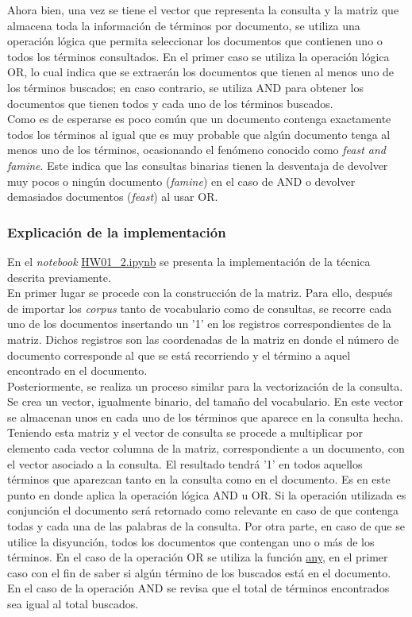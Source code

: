Ahora bien, una vez se tiene el vector que representa la consulta y la matriz que almacena toda la información de términos por documento, se utiliza una operación lógica que permita seleccionar los documentos que contienen uno o todos los términos consultados. En el primer caso se utiliza la operación lógica OR, lo cual indica que se extraerán los documentos que tienen al menos uno de los términos buscados; en caso contrario, se utiliza AND para obtener los documentos que tienen todos y cada uno de los términos buscados.\\

Como es de esperarse es poco común que un documento contenga exactamente todos los términos al igual que es muy probable que algún documento tenga al menos uno de los términos, ocasionando el fenómeno conocido como \textit{feast and famine}. Este indica que las consultas binarias tienen la desventaja de devolver muy pocos o ningún documento (\textit{famine}) en el caso de AND o devolver demasiados documentos (\textit{feast}) al usar OR.

\subsubsection{Explicación de la implementación}
En el \textit{notebook} \url{HW01_2.ipynb} se presenta la implementación de la técnica descrita previamente.\\

En primer lugar se procede con la construcción de la matriz. Para ello, después de importar los \textit{corpus} tanto de vocabulario como de consultas, se recorre cada uno de los documentos insertando un '1' en los registros correspondientes de la matriz. Dichos registros son las coordenadas de la matriz en donde el número de documento corresponde al que se está recorriendo y el término a aquel encontrado en el documento.\\

Posteriormente, se realiza un proceso similar para la vectorización de la consulta. Se crea un vector, igualmente binario, del tamaño del vocabulario. En este vector se almacenan unos en cada uno de los términos que aparece en la consulta hecha.\\

Teniendo esta matriz y el vector de consulta se procede a multiplicar por elemento cada vector columna de la matriz, correspondiente a un documento, con el vector asociado a la consulta. El resultado tendrá '1' en todos aquellos términos que aparezcan tanto en la consulta como en el documento. Es en este punto en donde aplica la operación lógica AND u OR. Si la operación utilizada es conjunción el documento será retornado como relevante en caso de que contenga todas y cada una de las palabras de la consulta. Por otra parte, en caso de que se utilice la disyunción, todos los documentos que contengan uno o más de los términos. En el caso de la operación OR se utiliza la función \url{any}, en el primer caso con el fin de saber si algún término de los buscados está en el documento. En el caso de la operación AND se revisa que el total de términos encontrados sea igual al total buscados.\\

